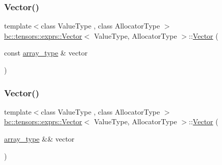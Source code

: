 \subsubsection{\texorpdfstring{Vector()}{Vector()}\hspace{0.1cm}{\footnotesize\ttfamily [2/5]}}
{\footnotesize\ttfamily template$<$class Value\+Type , class Allocator\+Type $>$ \\
\hyperlink{structbc_1_1tensors_1_1exprs_1_1Vector}{bc\+::tensors\+::exprs\+::\+Vector}$<$ Value\+Type, Allocator\+Type $>$\+::\hyperlink{structbc_1_1tensors_1_1exprs_1_1Vector}{Vector} (\begin{DoxyParamCaption}\item[{const \hyperlink{structbc_1_1tensors_1_1exprs_1_1Vector_a73521248268e63ecefe36bca57afcf20}{array\+\_\+type} \&}]{vector }\end{DoxyParamCaption})\hspace{0.3cm}{\ttfamily [inline]}}

\mbox{\label{structbc_1_1tensors_1_1exprs_1_1Vector_ac5fec84615ffd6518d962e9fa59000a5}} 
\subsubsection{\texorpdfstring{Vector()}{Vector()}\hspace{0.1cm}{\footnotesize\ttfamily [3/5]}}
{\footnotesize\ttfamily template$<$class Value\+Type , class Allocator\+Type $>$ \\
\hyperlink{structbc_1_1tensors_1_1exprs_1_1Vector}{bc\+::tensors\+::exprs\+::\+Vector}$<$ Value\+Type, Allocator\+Type $>$\+::\hyperlink{structbc_1_1tensors_1_1exprs_1_1Vector}{Vector} (\begin{DoxyParamCaption}\item[{\hyperlink{structbc_1_1tensors_1_1exprs_1_1Vector_a73521248268e63ecefe36bca57afcf20}{array\+\_\+type} \&\&}]{vector }\end{DoxyParamCaption})\hspace{0.3cm}{\ttfamily [inline]}}

\mbox{\label{structbc_1_1tensors_1_1exprs_1_1Vector_a20573e41b2964fbbb6a580016c2fcd27}} 
